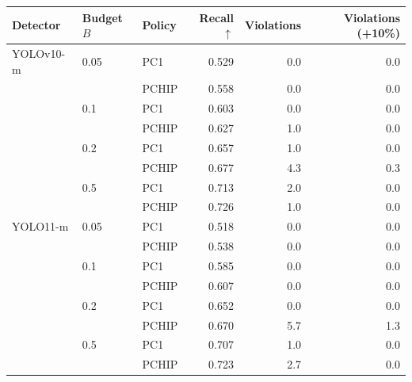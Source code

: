 \begin{tabular}{lllrrr}
\toprule
Detector & Budget $B$ & Policy & Recall $\uparrow$ & Violations & Violations (+10\%) \\
\midrule
YOLOv10-m & 0.05 & PC1 & 0.529 & 0.0 & 0.0 \\
 &  & PCHIP & 0.558 & 0.0 & 0.0 \\
 & 0.1 & PC1 & 0.603 & 0.0 & 0.0 \\
 &  & PCHIP & 0.627 & 1.0 & 0.0 \\
 & 0.2 & PC1 & 0.657 & 1.0 & 0.0 \\
 &  & PCHIP & 0.677 & 4.3 & 0.3 \\
 & 0.5 & PC1 & 0.713 & 2.0 & 0.0 \\
 &  & PCHIP & 0.726 & 1.0 & 0.0 \\
\midrule
YOLO11-m & 0.05 & PC1 & 0.518 & 0.0 & 0.0 \\
 &  & PCHIP & 0.538 & 0.0 & 0.0 \\
 & 0.1 & PC1 & 0.585 & 0.0 & 0.0 \\
 &  & PCHIP & 0.607 & 0.0 & 0.0 \\
 & 0.2 & PC1 & 0.652 & 0.0 & 0.0 \\
 &  & PCHIP & 0.670 & 5.7 & 1.3 \\
 & 0.5 & PC1 & 0.707 & 1.0 & 0.0 \\
 &  & PCHIP & 0.723 & 2.7 & 0.0 \\
\bottomrule
\end{tabular}
